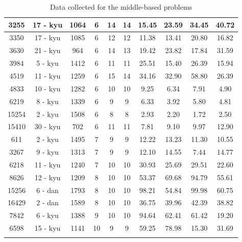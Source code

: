\documentclass{l4proj}
\begin{document}
\begin{appendices}
\begin{longtable}{|c|c|c|c|c|c|c|c|c|c|}
3255 & 17 - kyu & 1064 & 6 & 14 & 14 & 15.45 & 23.59 & 34.45 & 40.72 \\ \hline
3350 & 17 - kyu & 1085 & 6 & 12 & 12 & 11.38 & 13.41 & 20.80 & 16.82 \\ \hline
3630 & 21 - kyu & 964 & 6 & 14 & 13 & 19.42 & 23.82 & 17.84 & 31.59 \\ \hline
3984 & 5 - kyu & 1412 & 6 & 11 & 11 & 25.51 & 15.40 & 26.39 & 15.94 \\ \hline
4519 & 11 - kyu & 1259 & 6 & 15 & 14 & 34.16 & 32.90 & 58.80 & 26.39 \\ \hline
4833 & 10 - kyu & 1282 & 6 & 10 & 10 & 9.25 & 6.34 & 7.91 & 4.90 \\ \hline
6219 & 8 - kyu & 1339 & 6 & 9 & 9 & 6.33 & 3.92 & 5.80 & 4.81 \\ \hline
15254 & 2 - kyu & 1508 & 6 & 8 & 8 & 2.93 & 2.20 & 1.72 & 2.50 \\ \hline
15410 & 30 - kyu & 702 & 6 & 11 & 11 & 7.81 & 9.10 & 9.97 & 12.90 \\ \hline
611 & 2 - kyu & 1495 & 7 & 9 & 9 & 12.22 & 13.23 & 11.30 & 10.55 \\ \hline
3267 & 9 - kyu & 1313 & 7 & 9 & 9 & 12.10 & 14.55 & 7.44 & 14.77 \\ \hline
6218 & 11 - kyu & 1240 & 7 & 10 & 10 & 30.93 & 25.69 & 29.51 & 22.60 \\ \hline
8626 & 12 - kyu & 1209 & 8 & 10 & 10 & 53.37 & 69.68 & 94.79 & 55.61 \\ \hline
15256 & 6 - dan & 1793 & 8 & 10 & 10 & 98.21 & 54.84 & 99.98 & 60.75 \\ \hline
16429 & 2 - dan & 1589 & 8 & 10 & 10 & 36.75 & 39.96 & 42.39 & 38.82 \\ \hline
7842 & 6 - kyu & 1388 & 9 & 10 & 10 & 94.64 & 62.41 & 61.42 & 19.20 \\ \hline
6598 & 15 - kyu & 1141 & 10 & 9 & 9 & 59.25 & 78.98 & 15.30 & 31.69 \\ \hline
\caption{ Data collected for the middle-based problems}
\label{table:data-middle}
\end{longtable}



\end{appendices}
\end{document}
